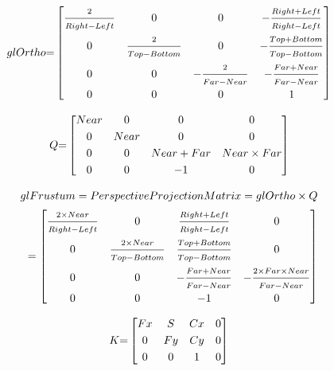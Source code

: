 {
	\setlength\arraycolsep{.15em}
	\tiny

	\begin{equation}\label{eq:glOrtho}
		glOrtho{=}
		\begin{bmatrix}
			\vfrac{2}{Right - Left} & 0 & 0 & -\vfrac{Right + Left}{Right - Left} \\[\smallskipamount]
			0 & \vfrac{2}{Top - Bottom} & 0 & -\vfrac{Top + Bottom}{Top - Bottom} \\[\smallskipamount]
			0 & 0 & -\vfrac{2}{Far - Near} & -\vfrac{Far + Near}{Far - Near} \\[\smallskipamount]
			0 & 0 & 0 & 1
		\end{bmatrix}
	\end{equation}

	\begin{equation}\label{eq:Q}
		Q{=}
		\begin{bmatrix}
			Near & 0 & 0 & 0 \\[\smallskipamount]
			0 & Near & 0 & 0 \\[\smallskipamount]
			0 & 0 & Near + Far & Near \times Far \\[\smallskipamount]
			0 & 0 & -1 & 0
		\end{bmatrix}
	\end{equation}

	\begin{equation}\label{eq:glFrustum}
		\begin{split}
			glFrustum = PerspectiveProjectionMatrix = glOrtho \times Q
			\\=
			\begin{bmatrix}
				\vfrac{2 \times Near}{Right - Left} & 0 & \vfrac{Right + Left}{Right - Left} & 0 \\[\smallskipamount]
				0 & \vfrac{2 \times Near}{Top - Bottom} & \vfrac{Top + Bottom}{Top - Bottom} & 0 \\[\smallskipamount]
				0 & 0 & -\vfrac{Far + Near}{Far - Near} & -\vfrac{2 \times Far \times Near}{Far - Near} \\[\smallskipamount]
				0 & 0 & -1 & 0
			\end{bmatrix}
		\end{split}
	\end{equation}

	\begin{equation}\label{eq:k}
		K{=}
		\begin{bmatrix}
			Fx & S & Cx & 0 \\[\smallskipamount]
			0 & Fy & Cy & 0 \\[\smallskipamount]
			0 & 0 & 1 & 0
		\end{bmatrix}
	\end{equation}
	
}
